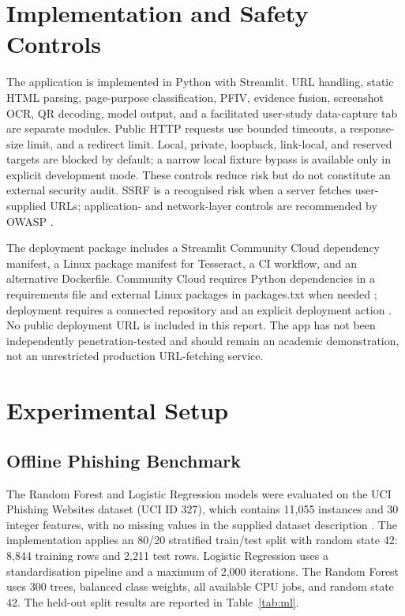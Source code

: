\documentclass[conference]{IEEEtran}
\begin{document}
\section{Implementation and Safety Controls}
The application is implemented in Python with Streamlit. URL handling, static HTML parsing, page-purpose classification, PFIV, evidence fusion, screenshot OCR, QR decoding, model output, and a facilitated user-study data-capture tab are separate modules. Public HTTP requests use bounded timeouts, a response-size limit, and a redirect limit. Local, private, loopback, link-local, and reserved targets are blocked by default; a narrow local fixture bypass is available only in explicit development mode. These controls reduce risk but do not constitute an external security audit. SSRF is a recognised risk when a server fetches user-supplied URLs; application- and network-layer controls are recommended by OWASP \cite{owasp}.

The deployment package includes a Streamlit Community Cloud dependency manifest, a Linux package manifest for Tesseract, a CI workflow, and an alternative Dockerfile. Community Cloud requires Python dependencies in a requirements file and external Linux packages in packages.txt when needed \cite{streamlitdeps}; deployment requires a connected repository and an explicit deployment action \cite{streamlitdeps}. No public deployment URL is included in this report. The app has not been independently penetration-tested and should remain an academic demonstration, not an unrestricted production URL-fetching service.

\section{Experimental Setup}
\subsection{Offline Phishing Benchmark}
The Random Forest and Logistic Regression models were evaluated on the UCI Phishing Websites dataset (UCI ID 327), which contains 11,055 instances and 30 integer features, with no missing values in the supplied dataset description \cite{uci}. The implementation applies an 80/20 stratified train/test split with random state 42: 8,844 training rows and 2,211 test rows. Logistic Regression uses a standardisation pipeline and a maximum of 2,000 iterations. The Random Forest uses 300 trees, balanced class weights, all available CPU jobs, and random state 42. The held-out split results are reported in Table~\ref{tab:ml}.
\end{document}
